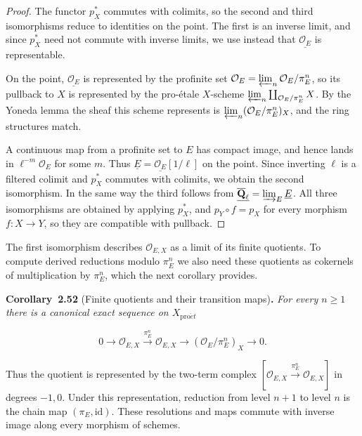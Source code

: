 \documentclass[11pt]{article}
\newenvironment{bpstatement}[2]{\par\addvspace{0.6\baselineskip}\noindent\textbf{#1}#2\textbf{.}\enspace\ignorespaces}
  {\par\addvspace{0.4\baselineskip}}
\newenvironment{bpstatementit}[2]{\begin{bpstatement}{#1}{#2}\itshape\ignorespaces}{\end{bpstatement}}
\begin{document}
\begin{proof}[{Proof}]\label{bp157}%
The functor \(p_X^*\) commutes with colimits, so the second and third isomorphisms reduce to identities on the point. The first is an inverse limit, and since \(p_X^*\) need not commute with inverse limits, we use instead that \(\underline{\mathcal O_E}\) is representable.

On the point, \(\underline{\mathcal O_E}\) is represented by the profinite set \(\mathcal O_E=\varprojlim_n\mathcal O_E/\pi_E^n\), so its pullback to \(X\) is represented by the pro-étale \(X\)-scheme \(\varprojlim_n\coprod_{\mathcal O_E/\pi_E^n}X\). By the Yoneda lemma the sheaf this scheme represents is \(\varprojlim_n(\mathcal O_E/\pi_E^n)_X\), and the ring structures match.

A continuous map from a profinite set to \(E\) has compact image, and hence lands in \(\ell^{-m}\mathcal O_E\) for some \(m\). Thus \(\underline E=\underline{\mathcal O_E}[1/\ell]\) on the point. Since inverting \(\ell\) is a filtered colimit and \(p_X^*\) commutes with colimits, we obtain the second isomorphism. In the same way the third follows from \(\underline{\overline{\mathbf Q}_\ell}=\varinjlim_E\underline E\). All three isomorphisms are obtained by applying \(p_X^*\), and \(p_Y\circ f=p_X\) for every morphism \(f:X\to Y\), so they are compatible with pullback.
\end{proof}

\label{bp158}%
The first isomorphism describes \(\mathcal O_{E,X}\) as a limit of its finite quotients. To compute derived reductions modulo \(\pi_E^n\) we also need these quotients as cokernels of multiplication by \(\pi_E^n\), which the next corollary provides.

\label{bp159}%
\begin{bpstatementit}{Corollary~2.52}{ (Finite quotients and their transition maps)}
For every \(n\geq1\) there is a canonical exact sequence on \(X_{\mathrm{pro}\acute{e}t}\)

\[
0\longrightarrow\mathcal O_{E,X}
\xrightarrow{\pi_E^n}\mathcal O_{E,X}
\longrightarrow(\mathcal O_E/\pi_E^n)_X\longrightarrow0.
\]

Thus the quotient is represented by the two-term complex \([\mathcal O_{E,X}\xrightarrow{\pi_E^n}\mathcal O_{E,X}]\) in degrees \(-1,0\). Under this representation, reduction from level \(n+1\) to level \(n\) is the chain map \((\pi_E,\mathrm{id})\). These resolutions and maps commute with inverse image along every morphism of schemes.
\end{bpstatementit}
\end{document}
